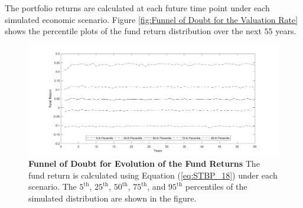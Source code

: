 \documentclass{sfuthesis}
\numberwithin{equation}{chapter}
\begin{document}
	
		\justify
		The portfolio returns are calculated at each future time point under each simulated economic scenario. Figure \ref{fig:Funnel of Doubt for the Valuation Rate} shows the percentile plots of the fund return distribution over the next $55$ years. 
		\begin{figure}[h]
			\includegraphics[width=\linewidth]{ResultPlot/frpct1.pdf} 
			\caption[Funnel of Doubt for Evolution of the Fund Returns]{\textbf{Funnel of Doubt for Evolution of the Fund Returns}
				\vspace{-0.4cm}
				\newline\footnotesize \justify The fund return is calculated using Equation (\ref{eq:STBP_18}) under each scenario. The $5^{\text{th}}$, $25^{\text{th}}$, $50^{\text{th}}$, $75^{\text{th}}$, and $95^{\text{th}}$ percentiles of the simulated distribution are shown in the figure.}
			\label{fig:Funnel of Doubt for Evolution of the Fund Returns}
		\end{figure}
	
\end{document}
